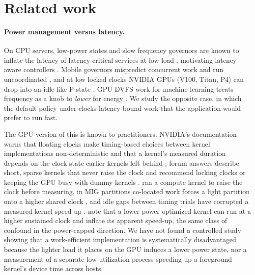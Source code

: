 \section{Related work}\label{sec:related}
\paragraph{Power management versus latency.} On CPU servers, low-power states and slow frequency governors are known to inflate the latency of latency-critical services at low load \citep{meisner2011powermgmt,kanev2014tradeoffs}, motivating latency-aware controllers \citep{lo2014pegasus,kasture2015rubik,hsu2015adrenaline,chou2019mudpm}. Mobile governors mispredict concurrent work and run uncoordinated \citep{pathania2014integrated,lin2023geardvfs,zhang2025mobiledvfs}, and at low locked clocks NVIDIA GPUs (V100, Titan, P4) can drop into an idle-like P-state \citep{adamek2021fftedge}. GPU DVFS work for machine learning treats frequency as a knob to \emph{lower} for energy \citep{tang2019gpudvfsdl,you2023zeus,chung2024perseus,qiu2024muserve,stojkovic2025dynamollm,kakolyris2025throttllem,maliakel2025llmdvfs,spaan2026kerneldvfs}. We study the opposite case, in which the default policy under-clocks latency-bound work that the application would prefer to run fast.

The GPU version of this is known to practitioners. NVIDIA's documentation warns that floating clocks make timing-based choices between kernel implementations non-deterministic and that a kernel's measured duration depends on the clock state earlier kernels left behind \citep{nvidia_tensorrt_env,nvidia_ncu}; forum answers describe short, sparse kernels that never raise the clock and recommend locking clocks or keeping the GPU busy with dummy kernels \citep{nvidia_forum_idle}. \citet{volkov2016latency} ran a compute kernel to raise the clock before measuring, in MIG partitions co-located work forces a light partition onto a higher shared clock \citep{patel2023cloudgpu}, and idle gaps between timing trials have corrupted a measured kernel speed-up \citep{agarwal2026kernels}. \citet{chu2026operatorprofiler} note that a lower-power optimized kernel can run at a higher sustained clock and inflate its apparent speed-up, the same class of confound in the power-capped direction. We have not found a controlled study showing that a work-efficient implementation is systematically disadvantaged because the lighter load it places on the GPU induces a lower power state, nor a measurement of a separate low-utilization process speeding up a foreground kernel's device time across hosts.

